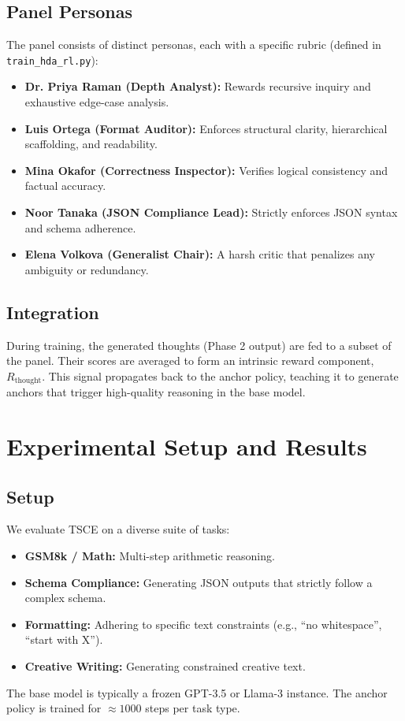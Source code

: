 \documentclass[11pt]{article}
\begin{document}
\subsection{Panel Personas}
The panel consists of distinct personas, each with a specific rubric (defined in \texttt{train\_hda\_rl.py}):
\begin{itemize}
    \item \textbf{Dr. Priya Raman (Depth Analyst):} Rewards recursive inquiry and exhaustive edge-case analysis.
    \item \textbf{Luis Ortega (Format Auditor):} Enforces structural clarity, hierarchical scaffolding, and readability.
    \item \textbf{Mina Okafor (Correctness Inspector):} Verifies logical consistency and factual accuracy.
    \item \textbf{Noor Tanaka (JSON Compliance Lead):} Strictly enforces JSON syntax and schema adherence.
    \item \textbf{Elena Volkova (Generalist Chair):} A harsh critic that penalizes any ambiguity or redundancy.
\end{itemize}

\subsection{Integration}
During training, the generated thoughts (Phase 2 output) are fed to a subset of the panel. Their scores are averaged to form an intrinsic reward component, $R_{\text{thought}}$. This signal propagates back to the anchor policy, teaching it to generate anchors that trigger high-quality reasoning in the base model.

\section{Experimental Setup and Results}

\subsection{Setup}
We evaluate TSCE on a diverse suite of tasks:
\begin{itemize}
    \item \textbf{GSM8k / Math:} Multi-step arithmetic reasoning.
    \item \textbf{Schema Compliance:} Generating JSON outputs that strictly follow a complex schema.
    \item \textbf{Formatting:} Adhering to specific text constraints (e.g., ``no whitespace'', ``start with X'').
    \item \textbf{Creative Writing:} Generating constrained creative text.
\end{itemize}
The base model is typically a frozen GPT-3.5 or Llama-3 instance. The anchor policy is trained for $\approx 1000$ steps per task type.
\end{document}
